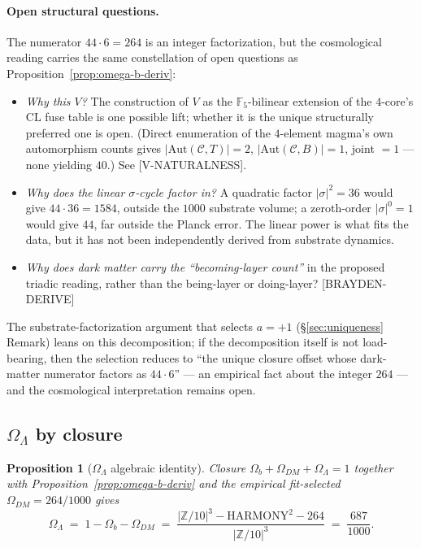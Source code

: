 \documentclass[11pt,reqno]{amsart}
\theoremstyle{plain}
\newtheorem{proposition}[theorem]{Proposition}
\theoremstyle{definition}
\theoremstyle{remark}
\newcommand{\Z}{\mathbb{Z}}
\newcommand{\F}{\mathbb{F}}
\newcommand{\Aut}{\mathrm{Aut}}
\begin{document}
\paragraph{Open structural questions.}
The numerator $44 \cdot 6 = 264$ is an integer factorization, but
the cosmological reading carries the same constellation of open
questions as Proposition~\ref{prop:omega-b-deriv}:
\begin{itemize}
\item \emph{Why this $V$?} The construction of $V$ as the
$\F_5$-bilinear extension of the $4$-core's $\mathrm{CL}$ fuse
table is one possible lift; whether it is the unique structurally
preferred one is open. (Direct enumeration of the $4$-element
magma's own automorphism counts gives
$|\Aut(\mathcal{C}, T)| = 2$, $|\Aut(\mathcal{C}, B)| = 1$,
joint $= 1$ --- none yielding $40$.) See \mbox{[V-NATURALNESS]}.
\item \emph{Why does the linear $\sigma$-cycle factor in?} A
quadratic factor $|\sigma|^{2} = 36$ would give
$44 \cdot 36 = 1584$, outside the $1000$ substrate volume; a
zeroth-order $|\sigma|^{0} = 1$ would give $44$, far outside the
Planck error. The linear power is what fits the data, but it has
not been independently derived from substrate dynamics.
\item \emph{Why does dark matter carry the
``becoming-layer count''} in the proposed triadic reading,
rather than the being-layer or doing-layer? \mbox{[BRAYDEN-DERIVE]}
\end{itemize}
The substrate-factorization argument that selects $a = +1$
(\S\ref{sec:uniqueness} Remark) leans on this decomposition; if
the decomposition itself is not load-bearing, then the selection
reduces to ``the unique closure offset whose dark-matter
numerator factors as $44 \cdot 6$'' --- an empirical fact about
the integer $264$ --- and the cosmological interpretation
remains open.

\subsection{$\Omega_\Lambda$ by closure}

\begin{proposition}[$\Omega_\Lambda$ algebraic identity]\label{prop:omega-l-deriv}
Closure $\Omega_b + \Omega_{DM} + \Omega_\Lambda = 1$ together
with Proposition~\ref{prop:omega-b-deriv} and the
empirical fit-selected $\Omega_{DM} = 264/1000$ gives
\[
  \Omega_\Lambda
  \;=\; 1 - \Omega_b - \Omega_{DM}
  \;=\; \frac{|\Z/10|^{3} - \mathrm{HARMONY}^{2} - 264}{|\Z/10|^{3}}
  \;=\; \frac{687}{1000}.
\]
\end{proposition}
\end{document}
